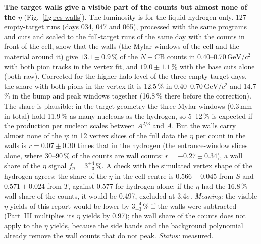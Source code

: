 \documentclass[11pt,a4paper]{article}
\newcommand{\GeVcc}{\ensuremath{\mathrm{GeV}/c^{2}}\xspace}
\begin{document}
\textbf{The target walls give a visible part of the counts but almost none of the $\eta$} (Fig.~\ref{fig:res-walls}). The luminosity is
for the liquid hydrogen only. 127 empty-target runs (days 034, 047 and 065), processed with the same programs and cuts and scaled to the
full-target runs of the same day with the counts in front of the cell, show that the walls (the Mylar windows of the cell and the material
around it) give $13.1\pm0.9$\,\% of the $N-\mathrm{CB}$ counts in 0.40--0.70\,\GeVcc with both pion tracks in the vertex fit, and
$19.0\pm1.1$\,\% with the base cuts alone (both raw). Corrected for the higher halo level of the three empty-target days, the share with
both pions in the vertex fit is 12.5\,\% in 0.40--0.70\,\GeVcc and 14.7\,\% in the bump and peak windows together (16.8\,\% there before the
correction). The share is plausible: in the target geometry the three Mylar windows (0.3\,mm in total) hold 11.9\,\% as many nucleons as the
hydrogen, so 5--12\,\% is expected if the production per nucleon scales between $A^{2/3}$ and $A$. But the walls carry almost none of the
$\eta$: in 12 vertex slices of the full data the $\eta$ per count in the walls is $r=0.07\pm0.30$ times that in the hydrogen (the
entrance-window slices alone, where 30--90\,\% of the counts are wall counts: $r=-0.27\pm0.34$), a wall share of the $\eta$ signal
$f_\eta=3^{+4}_{-3}$\,\%. A check with the simulated vertex shape of the hydrogen agrees: the share of the $\eta$ in the cell centre is
$0.566\pm0.045$ from $S$ and $0.571\pm0.024$ from $T$, against 0.577 for hydrogen alone; if the $\eta$ had the 16.8\,\% wall share of the
counts, it would be 0.497, excluded at 3.4$\sigma$. \emph{Meaning:} the visible $\eta$ yields of this report would be lower by
$3^{+4}_{-3}$\,\% if the walls were subtracted (Part~III multiplies its $\eta$ yields by 0.97); the wall share of the counts does not apply
to the $\eta$ yields, because the side bands and the background polynomial already remove the wall counts that do not peak.
\emph{Status:} measured.
\end{document}
